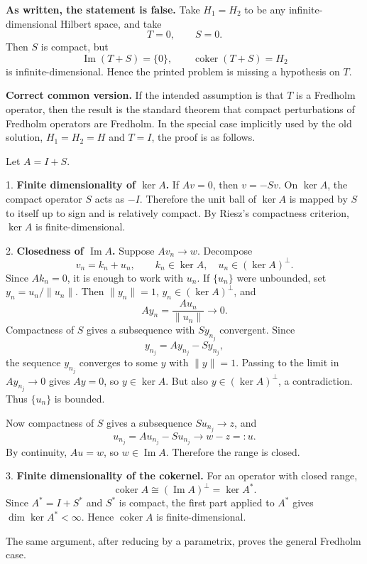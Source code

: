 \begin{solution}
\textbf{As written, the statement is false.}
Take $H_1=H_2$ to be any infinite-dimensional Hilbert space, and take
\[
T=0,\qquad S=0.
\]
Then $S$ is compact, but
\[
\operatorname{Im}(T+S)=\{0\},\qquad
\operatorname{coker}(T+S)=H_2
\]
is infinite-dimensional. Hence the printed problem is missing a hypothesis on $T$.

\textbf{Correct common version.}
If the intended assumption is that $T$ is a Fredholm operator, then the result is the standard theorem that compact perturbations of Fredholm operators are Fredholm. In the special case implicitly used by the old solution, $H_1=H_2=H$ and $T=I$, the proof is as follows.

Let $A=I+S$.

1. \textbf{Finite dimensionality of $\ker A$.}
If $Av=0$, then $v=-Sv$. On $\ker A$, the compact operator $S$ acts as $-I$. Therefore the unit ball of $\ker A$ is mapped by $S$ to itself up to sign and is relatively compact. By Riesz's compactness criterion, $\ker A$ is finite-dimensional.

2. \textbf{Closedness of $\operatorname{Im}A$.}
Suppose $Av_n\to w$. Decompose
\[
v_n=k_n+u_n,\qquad k_n\in\ker A,\quad u_n\in(\ker A)^\perp.
\]
Since $Ak_n=0$, it is enough to work with $u_n$. If $\{u_n\}$ were unbounded, set $y_n=u_n/\|u_n\|$. Then $\|y_n\|=1$, $y_n\in(\ker A)^\perp$, and
\[
Ay_n=\frac{Au_n}{\|u_n\|}\to 0.
\]
Compactness of $S$ gives a subsequence with $Sy_{n_j}$ convergent. Since
\[
y_{n_j}=Ay_{n_j}-Sy_{n_j},
\]
the sequence $y_{n_j}$ converges to some $y$ with $\|y\|=1$. Passing to the limit in $Ay_{n_j}\to0$ gives $Ay=0$, so $y\in\ker A$. But also $y\in(\ker A)^\perp$, a contradiction. Thus $\{u_n\}$ is bounded.

Now compactness of $S$ gives a subsequence $Su_{n_j}\to z$, and
\[
u_{n_j}=Au_{n_j}-Su_{n_j}\to w-z=:u.
\]
By continuity, $Au=w$, so $w\in\operatorname{Im}A$. Therefore the range is closed.

3. \textbf{Finite dimensionality of the cokernel.}
For an operator with closed range,
\[
\operatorname{coker}A\cong(\operatorname{Im}A)^\perp=\ker A^*.
\]
Since $A^*=I+S^*$ and $S^*$ is compact, the first part applied to $A^*$ gives $\dim\ker A^*<\infty$. Hence $\operatorname{coker}A$ is finite-dimensional.

The same argument, after reducing by a parametrix, proves the general Fredholm case.
\end{solution}


